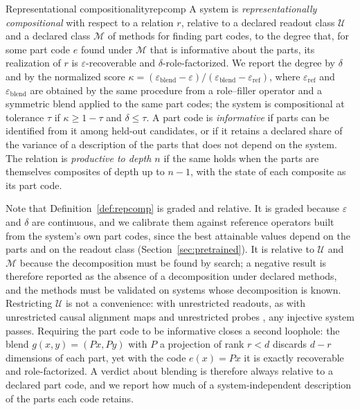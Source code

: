 \documentclass[10pt]{article}
\theoremstyle{plain}
\theoremstyle{remark}
\newcommand{\U}{\mathcal{U}}
\newcommand{\M}{\mathcal{M}}
\begin{document}
\begin{defbox}{Representational compositionality}{repcomp}
A system is \emph{representationally compositional} with respect to a relation $r$, relative to a declared readout class $\U$ and a declared class $\M$ of methods for finding part codes, to the degree that, for some part code $e$ found under $\M$ that is informative about the parts, its realization of $r$ is $\varepsilon$-recoverable and $\delta$-role-factorized. We report the degree by $\delta$ and by the normalized score $\kappa = (\varepsilon_{\mathrm{blend}} - \varepsilon)/(\varepsilon_{\mathrm{blend}} - \varepsilon_{\mathrm{ref}})$, where $\varepsilon_{\mathrm{ref}}$ and $\varepsilon_{\mathrm{blend}}$ are obtained by the same procedure from a role--filler operator and a symmetric blend applied to the same part codes; the system is compositional at tolerance $\tau$ if $\kappa \ge 1 - \tau$ and $\delta \le \tau$. A part code is \emph{informative} if parts can be identified from it among held-out candidates, or if it retains a declared share of the variance of a description of the parts that does not depend on the system. The relation is \emph{productive to depth $n$} if the same holds when the parts are themselves composites of depth up to $n - 1$, with the state of each composite as its part code.
\end{defbox}

Note that Definition~\ref{def:repcomp} is graded and relative. It is graded because $\varepsilon$ and $\delta$ are continuous, and we calibrate them against reference operators built from the system's own part codes, since the best attainable values depend on the parts and on the readout class (Section~\ref{sec:pretrained}). It is relative to $\U$ and $\M$ because the decomposition must be found by search; a negative result is therefore reported as the absence of a decomposition under declared methods, and the methods must be validated on systems whose decomposition is known. Restricting $\U$ is not a convenience: with unrestricted readouts, as with unrestricted causal alignment maps \citep{sutter2025} and unrestricted probes \citep{hewitt2019}, any injective system passes. Requiring the part code to be informative closes a second loophole: the blend $g(x, y) = (Px, Py)$ with $P$ a projection of rank $r < d$ discards $d - r$ dimensions of each part, yet with the code $e(x) = Px$ it is exactly recoverable and role-factorized. A verdict about blending is therefore always relative to a declared part code, and we report how much of a system-independent description of the parts each code retains.
\end{document}
